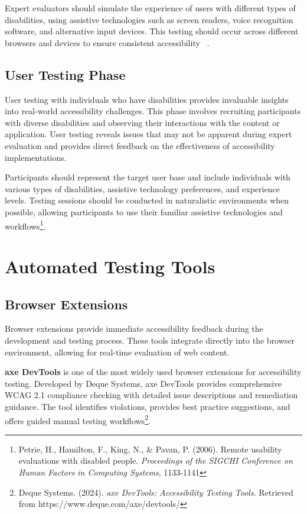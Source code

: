 Expert evaluators should simulate the experience of users with different types of disabilities, using assistive technologies such as screen readers, voice recognition software, and alternative input devices. This testing should occur across different browsers and devices to ensure consistent accessibility~ \cite{PowerAccessibility}.

\subsection{User Testing Phase}

User testing with individuals who have disabilities provides invaluable insights into real-world accessibility challenges. This phase involves recruiting participants with diverse disabilities and observing their interactions with the content or application. User testing reveals issues that may not be apparent during expert evaluation and provides direct feedback on the effectiveness of accessibility implementations.

Participants should represent the target user base and include individuals with various types of disabilities, assistive technology preferences, and experience levels. Testing sessions should be conducted in naturalistic environments when possible, allowing participants to use their familiar assistive technologies and workflows\footnote{Petrie, H., Hamilton, F., King, N., \& Pavan, P. (2006). Remote usability evaluations with disabled people. \textit{Proceedings of the SIGCHI Conference on Human Factors in Computing Systems}, 1133-1141}.

\section{Automated Testing Tools}
\label{sec:automated-tools}

\subsection{Browser Extensions}

Browser extensions provide immediate accessibility feedback during the development and testing process. These tools integrate directly into the browser environment, allowing for real-time evaluation of web content.

\textbf{axe DevTools} is one of the most widely used browser extensions for accessibility testing. Developed by Deque Systems, axe DevTools provides comprehensive WCAG 2.1 compliance checking with detailed issue descriptions and remediation guidance. The tool identifies violations, provides best practice suggestions, and offers guided manual testing workflows\footnote{Deque Systems. (2024). \textit{axe DevTools: Accessibility Testing Tools}. Retrieved from https://www.deque.com/axe/devtools/}.

